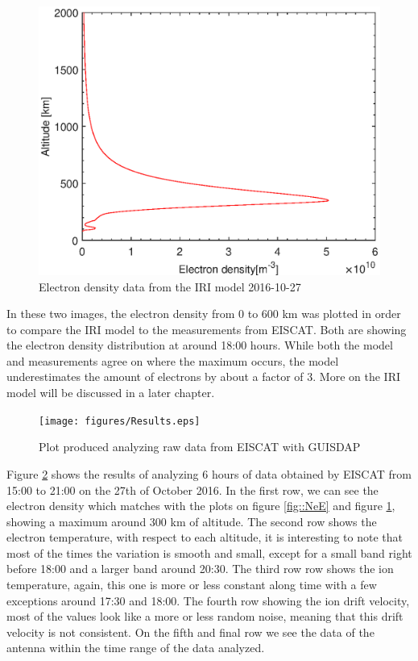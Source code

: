 \begin{minipage}{0.45\textwidth}
	\begin{flushright}
	\begin{figure}[H]
	\centering
	\includegraphics[width=\textwidth]{figures/NeIRI.eps}
	\caption{Electron density data from the IRI model 2016-10-27}
	\label{fig::NeIRI1}
	\end{figure}
	\end{flushright}
\end{minipage}

In these two images, the electron density from 0 to 600 km was plotted in order to compare the IRI model to the measurements from EISCAT. Both are showing the electron density distribution at around 18:00 hours. While both the model and measurements agree on where the maximum occurs, the model underestimates the amount of electrons by about a factor of 3. More on the IRI model will be discussed in a later chapter.

\begin{figure}[H]
	\centering
	\texttt{[image: figures/Results.eps]}
	\caption{Plot produced analyzing raw data from EISCAT with GUISDAP}
	\label{fig::resultsE1}
\end{figure}

Figure \ref{fig::resultsE1} shows the results of analyzing 6 hours of data obtained by EISCAT from 15:00  to 21:00 on the 27th of October 2016. In the first row, we can see the electron density which matches with the plots on figure \ref{fig::NeE} and figure \ref{fig::NeIRI1}, showing a maximum around 300 km of altitude. The second row shows the electron temperature, with respect to each altitude, it is interesting to note that most of the times the variation is smooth and small, except for a small band right before 18:00 and a larger band around 20:30. The third row row shows the ion temperature, again, this one is more or less constant along time with a few exceptions around 17:30 and 18:00. The fourth row showing the ion drift velocity,  most of the values look like a more or less random noise, meaning that this drift velocity is not consistent. On the fifth and final row we see the data of the antenna  within the time range of the data analyzed.